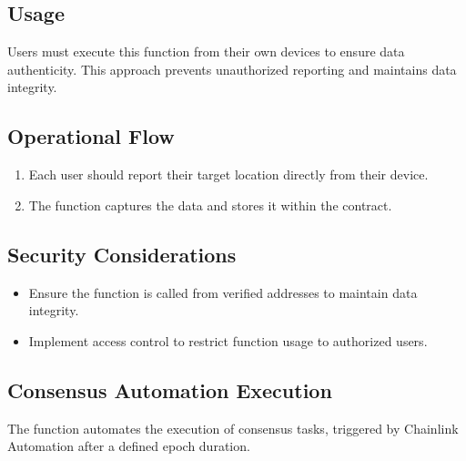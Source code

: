 \documentclass[a4paper,10pt,english]{sphinxmanual}
\begin{document}
\subsection{Usage}
\label{\detokenize{docs_consensus_mechanism_contract:id2}}
\sphinxAtStartPar
Users must execute this function from their own devices to ensure data authenticity. This approach prevents unauthorized reporting and maintains data integrity.


\subsection{Operational Flow}
\label{\detokenize{docs_consensus_mechanism_contract:operational-flow}}\begin{enumerate}
%
\item {} 
\sphinxAtStartPar
{} Each user should report their target location directly from their device.

\item {} 
\sphinxAtStartPar
{} The function captures the  data and stores it within the contract.

\end{enumerate}


\subsection{Security Considerations}
\label{\detokenize{docs_consensus_mechanism_contract:id3}}\begin{itemize}
\item {} 
\sphinxAtStartPar
{} Ensure the function is called from verified addresses to maintain data integrity.

\item {} 
\sphinxAtStartPar
{} Implement access control to restrict function usage to authorized users.

\end{itemize}


\subsection{Consensus Automation Execution}
\label{\detokenize{docs_consensus_mechanism_contract:consensus-automation-execution}}
\sphinxAtStartPar
The  function automates the execution of consensus tasks, triggered by Chainlink Automation after a defined epoch duration.
\end{document}
